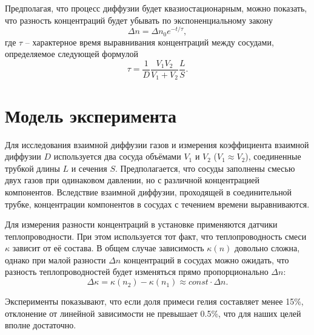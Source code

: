 \documentclass[a4paper, 12pt]{article}
\begin{document}
        Предполагая, что процесс диффузии будет квазиостационарным, можно показать, что разность концентраций будет убывать по экспоненциальному закону
        \begin{equation}
            \label{Delta_n}
            \Delta n = \Delta n_0 e^{-t / \tau},
        \end{equation}
        где $\tau$ -- характерное время выравнивания концентраций между сосудами, определяемое следующей формулой
        \begin{equation}
            \label{Tau}
            \tau = \frac{1}{D} \frac{V_1V_2}{V_1 + V_2} \frac{L}{S}.
        \end{equation}

    \section{Модель эксперимента}
        Для   исследования   взаимной диффузии газов и измерения коэффициента взаимной диффузии  $D$  используется  два сосуда  объёмами  $V_1$ и $V_2$ ($V_1 \approx V_2$), соединенные трубкой длины $L$ и сечения  $S$. Предполагается, что сосуды заполнены смесью двух газов при одинаковом давлении, но с различной концентрацией компонентов. Вследствие взаимной диффузии, проходящей в   соединительной трубке, концентрации компонентов в сосудах с течением времени выравниваются.

        Для измерения разности  концентраций  в установке применяются датчики теплопроводности. При этом используется тот факт, что теплопроводность смеси $\kappa$ зависит от её состава. В общем случае   зависимость  $\kappa (n)$  довольно   сложна,   однако   при   малой   разности  $\Delta n$ концентраций в сосудах можно ожидать, что разность теплопроводностей будет изменяться прямо пропорционально $\Delta n:$
        \begin{equation*}
            \Delta \kappa = \kappa (n_2) - \kappa (n_1) \approx const \cdot \Delta n.
        \end{equation*}

        Эксперименты показывают, что если доля примеси гелия составляет менее 15\%, отклонение от линейной зависимости не превышает 0.5\%, что для наших целей вполне достаточно.
\end{document}
